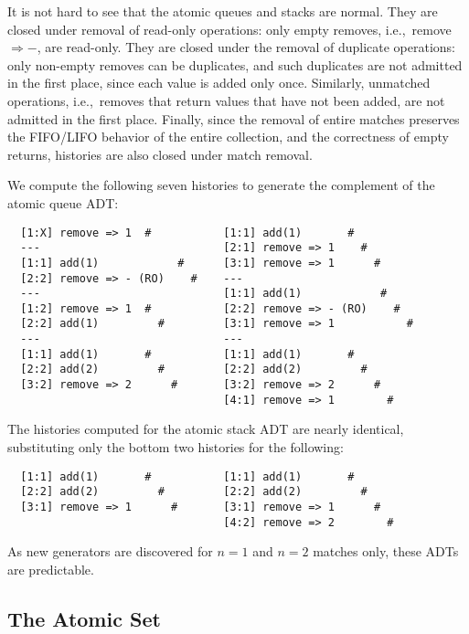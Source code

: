 It is not hard to see that the atomic queues and stacks are
normal. They are closed under removal of read-only operations: only empty
removes, i.e.,~remove $\Rightarrow -$, are read-only. They are
closed under the removal of duplicate operations: only non-empty removes can be
duplicates, and such duplicates are not admitted in the first place, since each
value is added only once. Similarly, unmatched operations, i.e.,~removes that
return values that have not been added, are not admitted in the first place.
Finally, since the removal of entire matches preserves the FIFO/LIFO behavior
of the entire collection, and the correctness of empty returns, histories are
also closed under match removal.

We compute the following seven histories to generate the complement of the
atomic queue ADT:
\begin{verbatim}
  [1:X] remove => 1  #           [1:1] add(1)       #
  ---                            [2:1] remove => 1    #
  [1:1] add(1)            #      [3:1] remove => 1      #
  [2:2] remove => - (RO)    #    ---
  ---                            [1:1] add(1)            #
  [1:2] remove => 1  #           [2:2] remove => - (RO)    #
  [2:2] add(1)         #         [3:1] remove => 1           #
  ---                            ---
  [1:1] add(1)       #           [1:1] add(1)       #
  [2:2] add(2)         #         [2:2] add(2)         #
  [3:2] remove => 2      #       [3:2] remove => 2      #
                                 [4:1] remove => 1        #
\end{verbatim}
The histories computed for the atomic stack ADT are nearly identical,
substituting only the bottom two histories for the following:
\begin{verbatim}
  [1:1] add(1)       #           [1:1] add(1)       #
  [2:2] add(2)         #         [2:2] add(2)         #
  [3:1] remove => 1      #       [3:1] remove => 1      #
                                 [4:2] remove => 2        #
\end{verbatim}
As new generators are discovered for $n=1$ and $n=2$ matches only, these ADTs
are predictable.

\subsection{The Atomic Set}

